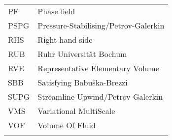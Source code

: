 {{\begin{tabu}{p{2cm} p{12cm}}
PF		&	Phase field 					\\
PSPG	&	Pressure-Stabilising/Petrov-Galerkin \\
RHS		& 	Right-hand side					\\ 
RUB		& 	Ruhr Universität Bochum 		\\ 
RVE		&	Representative Elementary Volume\\
SBB		&	Satisfying Babuška-Brezzi \\
SUPG	&	Streamline-Upwind/Petrov-Galerkin \\
VMS		&	Variational MultiScale			\\
VOF		&	Volume Of Fluid					\\\tabucline[1pt]{-}
\end{tabu}}
}
\newlength{\largeur}
\newlength{\llargeur}
\newlength{\llargeurOut}
\newlength{\rlargeur}
\newlength{\rlargeurOut}
